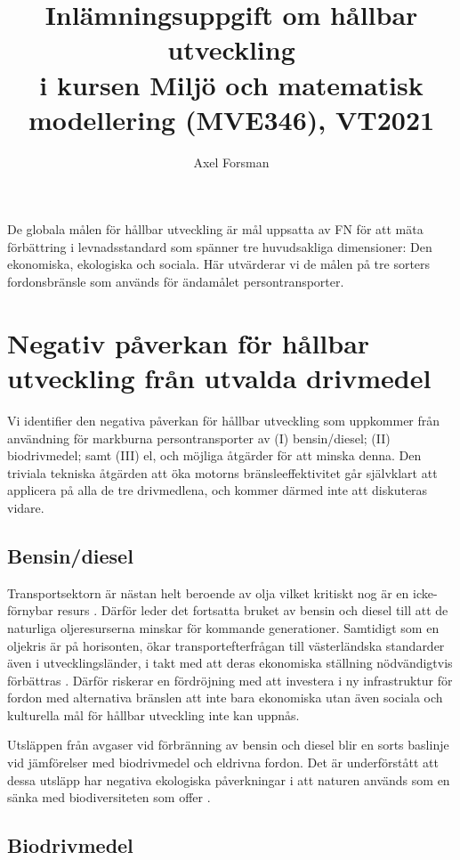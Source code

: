 \documentclass{article}
\title{Inlämningsuppgift om hållbar utveckling\\ i kursen Miljö och matematisk modellering (MVE346), VT2021}
\author{Axel Forsman}
\begin{document}
\maketitle

De globala målen för hållbar utveckling är mål uppsatta av FN
för att mäta förbättring i levnadsstandard
som spänner tre huvudsakliga dimensioner: Den ekonomiska, ekologiska och sociala.
Här utvärderar vi de målen på tre sorters fordonsbränsle som används
för ändamålet persontransporter.

\section{Negativ påverkan för hållbar utveckling från utvalda drivmedel}

Vi identifier den negativa påverkan för hållbar utveckling
som uppkommer från användning för markburna persontransporter av
(I) bensin/diesel; (II) biodrivmedel; samt (III) el,
och möjliga åtgärder för att minska denna.
Den triviala tekniska åtgärden att öka motorns bränsleeffektivitet
går självklart att applicera på alla de tre drivmedlena,
och kommer därmed inte att diskuteras vidare. 

\subsection{Bensin/diesel}

Transportsektorn är nästan helt beroende av olja vilket kritiskt nog är
en icke-förnybar resurs \autocite{gudmundsson96}.
Därför leder det fortsatta bruket av bensin och diesel till att
de naturliga oljeresurserna minskar för kommande generationer.
Samtidigt som en oljekris är på horisonten, ökar transportefterfrågan
till västerländska standarder även i utvecklingsländer,
i takt med att deras ekonomiska ställning nödvändigtvis förbättras \autocite{edenhofer15}.
Därför riskerar en fördröjning med att investera i ny infrastruktur för
fordon med alternativa bränslen
att inte bara ekonomiska utan även sociala och kulturella mål
för hållbar utveckling inte kan uppnås.

Utsläppen från avgaser vid förbränning av bensin och diesel
blir en sorts baslinje vid jämförelser med biodrivmedel och eldrivna fordon.
Det är underförstått att dessa utsläpp har negativa ekologiska påverkningar
i att naturen används som en sänka med biodiversiteten som offer \autocite{gudmundsson96}.

\subsection{Biodrivmedel}
\end{document}
